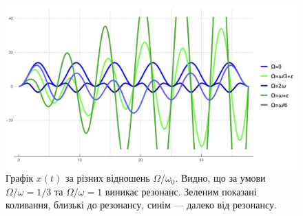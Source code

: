 \documentclass{hw_template}
\begin{document}
\begin{figure}
    \centering
    \includegraphics[width=0.8\linewidth]{images/test_1_problem_3.png}
    \caption{Графік $x(t)$ за різних відношень $\Omega/\omega_0$. Видно, що за умови $\Omega/\omega=1/3$ та $\Omega/\omega=1$ виникає резонанс. Зеленим показані коливання, близькі до резонансу, синім --- далеко від резонансу.}
    \label{fig:my_label}
\end{figure}
\end{document}
